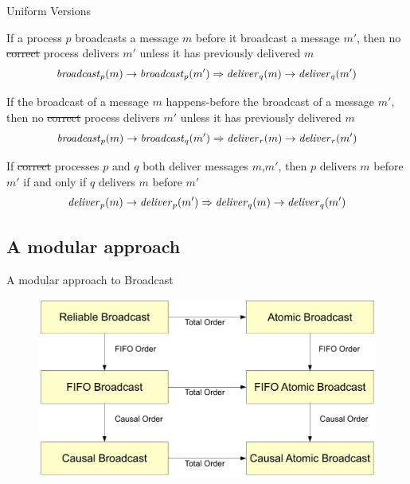 \begin{frame}{Uniform Versions}

{\footnotesize
\begin{definition}
If a process $p$ broadcasts a message $m$ before it broadcast a message $m'$, then 
no \sout{correct} process delivers $m'$ unless it has previously delivered $m$
\[
  \mathit{broadcast}_p(m) \rightarrow \mathit{broadcast}_p(m') \Rightarrow \mathit{deliver}_q(m) \rightarrow \mathit{deliver}_q(m')
\]
\end{definition}

\begin{definition}
If the broadcast of a message $m$ \alert{happens-before} the broadcast of a message $m'$, then 
no \sout{correct} process delivers $m'$ unless it has previously delivered $m$
\[
  \mathit{broadcast}_p(m) \rightarrow \mathit{broadcast}_q(m') \Rightarrow \mathit{deliver}_r(m) \rightarrow \mathit{deliver}_r(m')
\]
\end{definition}

\begin{definition}
If \sout{correct} processes $p$ and $q$ both deliver messages $m$,$m'$, then $p$ delivers $m$ before $m'$ if and only if $q$ delivers $m$ before $m'$
\[
  \mathit{deliver}_p(m) \rightarrow \mathit{deliver}_p(m') \Rightarrow \mathit{deliver}_q(m) \rightarrow \mathit{deliver}_q(m')
\]
\end{definition}
}
\end{frame}

\subsection{A modular approach}

\begin{frame}{A modular approach to Broadcast}

\begin{figure}
	\includegraphics[width=\textwidth]{figs/04/rb-modular-rb1}
\end{figure}

\end{frame}

